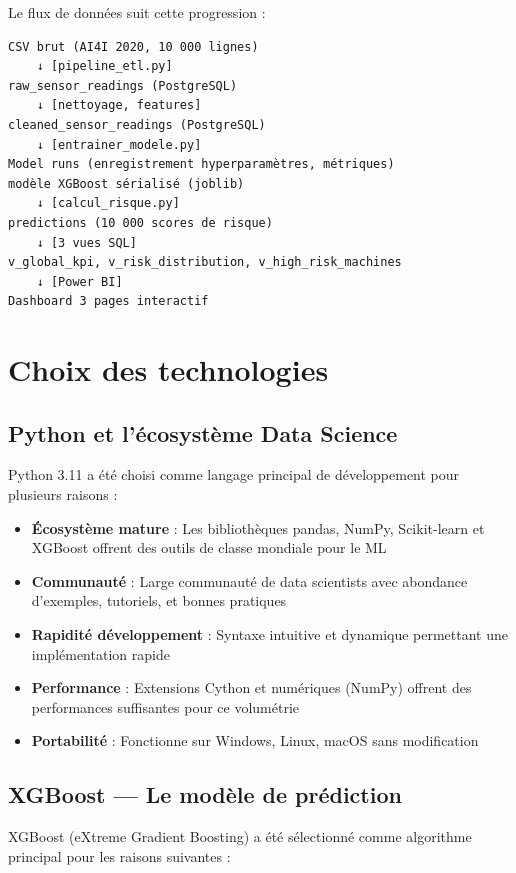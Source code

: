 \documentclass[a4paper,12pt,twoside]{report}
\begin{document}
Le flux de données suit cette progression :

\begin{verbatim}
CSV brut (AI4I 2020, 10 000 lignes)
    ↓ [pipeline_etl.py]
raw_sensor_readings (PostgreSQL)
    ↓ [nettoyage, features]
cleaned_sensor_readings (PostgreSQL)
    ↓ [entrainer_modele.py]
Model runs (enregistrement hyperparamètres, métriques)
modèle XGBoost sérialisé (joblib)
    ↓ [calcul_risque.py]
predictions (10 000 scores de risque)
    ↓ [3 vues SQL]
v_global_kpi, v_risk_distribution, v_high_risk_machines
    ↓ [Power BI]
Dashboard 3 pages interactif
\end{verbatim}

\section{Choix des technologies}

\subsection{Python et l'écosystème Data Science}

Python 3.11 a été choisi comme langage principal de développement pour plusieurs raisons :

\begin{itemize}
    \item \textbf{Écosystème mature} : Les bibliothèques pandas, NumPy, Scikit-learn et XGBoost offrent des outils de classe mondiale pour le ML
    \item \textbf{Communauté} : Large communauté de data scientists avec abondance d'exemples, tutoriels, et bonnes pratiques
    \item \textbf{Rapidité développement} : Syntaxe intuitive et dynamique permettant une implémentation rapide
    \item \textbf{Performance} : Extensions Cython et numériques (NumPy) offrent des performances suffisantes pour ce volumétrie
    \item \textbf{Portabilité} : Fonctionne sur Windows, Linux, macOS sans modification
\end{itemize}

\subsection{XGBoost — Le modèle de prédiction}

XGBoost (eXtreme Gradient Boosting) a été sélectionné comme algorithme principal pour les raisons suivantes :
\end{document}
